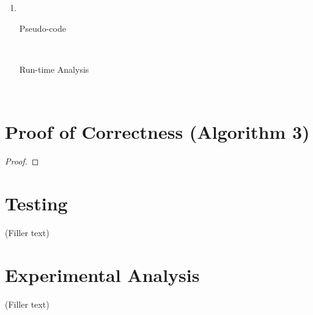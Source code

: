 \documentclass[paper=a4, fontsize=11pt]{scrartcl} %
\numberwithin{equation}{section} %
\numberwithin{figure}{section} %
\numberwithin{table}{section} %
\begin{document}
\begin{enumerate}[label=\bfseries Algorithm \arabic*:]
    \item \hfill \\
    \begin{description}
        \item[Pseudo-code] \hfill \\
        \item[Run-time Analysis] \hfill \\
    \end{description}
\end{enumerate}

\section{Proof of Correctness (Algorithm 3)}
\begin{proof}
\end{proof}

\section{Testing}
(Filler text)

\section{Experimental Analysis}
(Filler text)
\end{document}
